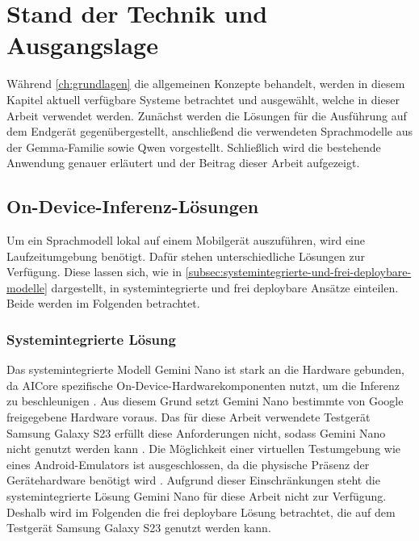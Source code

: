 \chapter{Stand der Technik und Ausgangslage}
\label{ch:standdertechnik}
Während \autoref{ch:grundlagen} die allgemeinen Konzepte behandelt, werden in diesem Kapitel aktuell verfügbare Systeme betrachtet und ausgewählt, welche in dieser Arbeit verwendet werden. Zunächst werden die Lösungen für die Ausführung auf dem Endgerät gegenübergestellt, anschließend die verwendeten Sprachmodelle aus der Gemma-Familie sowie Qwen vorgestellt. Schließlich wird die bestehende Anwendung genauer erläutert und der Beitrag dieser Arbeit aufgezeigt.

\section{On-Device-Inferenz-Lösungen}
\label{sec:ondevice-loesungen}
Um ein Sprachmodell lokal auf einem Mobilgerät auszuführen, wird eine Laufzeitumgebung benötigt. Dafür stehen unterschiedliche Lösungen zur Verfügung. 
Diese lassen sich, wie in \autoref{subsec:systemintegrierte-und-frei-deploybare-modelle} dargestellt, in systemintegrierte und frei deploybare Ansätze einteilen. Beide werden im Folgenden betrachtet.
\subsection{Systemintegrierte Lösung}
\label{subsec:systemintegrierte-loesung}
Das systemintegrierte Modell Gemini Nano ist stark an die Hardware gebunden, da AICore spezifische On-Device-Hardwarekomponenten nutzt, um die Inferenz zu beschleunigen \autocite{gemininano}. Aus diesem Grund setzt Gemini Nano bestimmte von Google freigegebene Hardware voraus. Das für diese Arbeit verwendete Testgerät Samsung Galaxy S23 erfüllt diese Anforderungen nicht, sodass Gemini Nano nicht genutzt werden kann \autocite{mlkit_genai_devices}.
Die Möglichkeit einer virtuellen Testumgebung wie eines Android-Emulators ist ausgeschlossen, da die physische Präsenz der Gerätehardware benötigt wird \autocite{gemininano,edgellm_review}.
Aufgrund dieser Einschränkungen steht die systemintegrierte Lösung Gemini Nano für diese Arbeit nicht zur Verfügung. Deshalb wird im Folgenden die frei deploybare Lösung betrachtet, die auf dem Testgerät Samsung Galaxy S23 genutzt werden kann.

